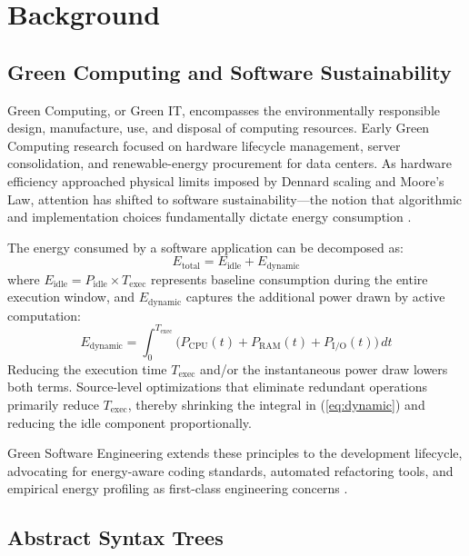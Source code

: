 \documentclass[conference]{IEEEtran}
\begin{document}
\section{Background}

\subsection{Green Computing and Software Sustainability}

Green Computing, or Green IT, encompasses the environmentally responsible
design, manufacture, use, and disposal of computing resources.  Early Green
Computing research focused on hardware lifecycle management, server
consolidation, and renewable-energy procurement for data centers.  As hardware
efficiency approached physical limits imposed by Dennard scaling and Moore's
Law, attention has shifted to software sustainability---the notion that
algorithmic and implementation choices fundamentally dictate energy consumption
\cite{ref4}.

The energy consumed by a software application can be decomposed as:
\begin{equation}
  E_{\text{total}} = E_{\text{idle}} + E_{\text{dynamic}}
  \label{eq:energy_total}
\end{equation}
where $E_{\text{idle}} = P_{\text{idle}} \times T_{\text{exec}}$ represents
baseline consumption during the entire execution window, and $E_{\text{dynamic}}$
captures the additional power drawn by active computation:
\begin{equation}
  E_{\text{dynamic}} = \int_{0}^{T_{\text{exec}}}
    \bigl(P_{\text{CPU}}(t) + P_{\text{RAM}}(t) + P_{\text{I/O}}(t)\bigr)\,dt
  \label{eq:dynamic}
\end{equation}
Reducing the execution time $T_{\text{exec}}$ and/or the instantaneous power
draw lowers both terms.  Source-level optimizations that eliminate redundant
operations primarily reduce $T_{\text{exec}}$, thereby shrinking the integral
in (\ref{eq:dynamic}) and reducing the idle component proportionally.

Green Software Engineering extends these principles to the development
lifecycle, advocating for energy-aware coding standards, automated
refactoring tools, and empirical energy profiling as first-class engineering
concerns \cite{ref13}.

\subsection{Abstract Syntax Trees}
\end{document}
